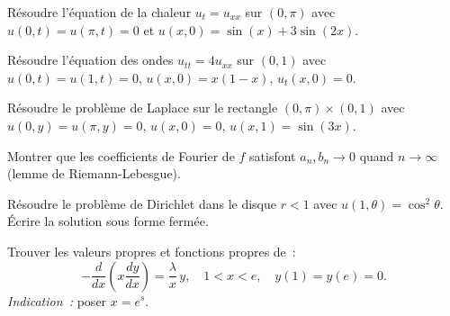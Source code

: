 \begin{exercice}
R\'esoudre l'\'equation de la chaleur $u_t = u_{xx}$ sur $(0,\pi)$
avec $u(0,t) = u(\pi,t) = 0$ et $u(x,0) = \sin(x) + 3\sin(2x)$.
\end{exercice}

\begin{exercice}
R\'esoudre l'\'equation des ondes $u_{tt} = 4u_{xx}$ sur $(0,1)$
avec $u(0,t) = u(1,t) = 0$, $u(x,0) = x(1-x)$, $u_t(x,0) = 0$.
\end{exercice}

\begin{exercice}
R\'esoudre le probl\`eme de Laplace sur le rectangle $(0,\pi) \times (0,1)$
avec $u(0,y) = u(\pi,y) = 0$, $u(x,0) = 0$, $u(x,1) = \sin(3x)$.
\end{exercice}

\begin{exercice}
Montrer que les coefficients de Fourier de $f$ satisfont
$a_n, b_n \to 0$ quand $n \to \infty$ (lemme de Riemann-Lebesgue).
\end{exercice}

\begin{exercice}
R\'esoudre le probl\`eme de Dirichlet dans le disque $r < 1$
avec $u(1,\theta) = \cos^2\theta$. \'Ecrire la solution sous
forme ferm\'ee.
\end{exercice}

\begin{exercice}
Trouver les valeurs propres et fonctions propres de~:
\[
    -\frac{d}{dx}\left(x\frac{dy}{dx}\right) = \frac{\lambda}{x}\, y,
    \quad 1 < x < e, \quad y(1) = y(e) = 0.
\]
\emph{Indication~:} poser $x = e^s$.
\end{exercice}
